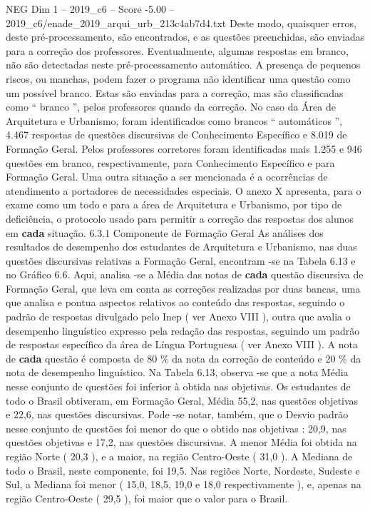 \begin{textsample}{NEG Dim 1 – 2019\_c6 – Score -5.00 – 2019\_c6/enade\_2019\_arqui\_urb\_213c4ab7d4.txt}
Deste modo, quaisquer erros, deste pré-processamento, são encontrados, e as questões preenchidas, são enviadas para a correção dos professores.
Eventualmente, algumas respostas em branco, não são detectadas neste pré-processamento automático.
A presença de pequenos riscos, ou manchas, podem fazer o programa não identificar uma questão como um possível branco.
Estas são enviadas para a correção, mas são classificadas como “ branco ”, pelos professores quando da correção.
No caso da Área de Arquitetura e Urbanismo, foram identificados como brancos “ automáticos ”, 4.467 respostas de questões discursivas de Conhecimento Específico e 8.019 de Formação Geral.
Pelos professores corretores foram identificadas mais 1.255 e 946 questões em branco, respectivamente, para Conhecimento Específico e para Formação Geral.
Uma outra situação a ser mencionada é a ocorrências de atendimento a portadores de necessidades especiais.
O anexo X apresenta, para o exame como um todo e para a área de Arquitetura e Urbanismo, por tipo de deficiência, o protocolo usado para permitir a correção das respostas dos alunos em \textbf{cada} situação. 6.3.1 Componente de Formação Geral As análises dos resultados de desempenho dos estudantes de Arquitetura e Urbanismo, nas duas questões discursivas relativas a Formação Geral, encontram -se na Tabela 6.13 e no Gráfico 6.6.
Aqui, analisa -se a Média das notas de \textbf{cada} questão discursiva de Formação Geral, que leva em conta as correções realizadas por duas bancas, uma que analisa e pontua aspectos relativos ao conteúdo das respostas, seguindo o padrão de respostas divulgado pelo Inep ( ver Anexo VIII ), outra que avalia o desempenho linguístico expresso pela redação das respostas, seguindo um padrão de respostas específico da área de Língua Portuguesa ( ver Anexo VIII ).
A nota de \textbf{cada} questão é composta de 80 \% da nota da correção de conteúdo e 20 \% da nota de desempenho linguístico.
Na Tabela 6.13, observa -se que a nota Média nesse conjunto de questões foi inferior à obtida nas objetivas.
Os estudantes de todo o Brasil obtiveram, em Formação Geral, Média 55,2, nas questões objetivas e 22,6, nas questões discursivas.
Pode -se notar, também, que o Desvio padrão nesse conjunto de questões foi menor do que o obtido nas objetivas : 20,9, nas questões objetivas e 17,2, nas questões discursivas.
A menor Média foi obtida na região Norte ( 20,3 ), e a maior, na região Centro-Oeste ( 31,0 ).
A Mediana de todo o Brasil, neste componente, foi 19,5.
Nas regiões Norte, Nordeste, Sudeste e Sul, a Mediana foi menor ( 15,0, 18,5, 19,0 e 18,0 respectivamente ), e, apenas na região Centro-Oeste ( 29,5 ), foi maior que o valor para o Brasil.

\end{textsample}
